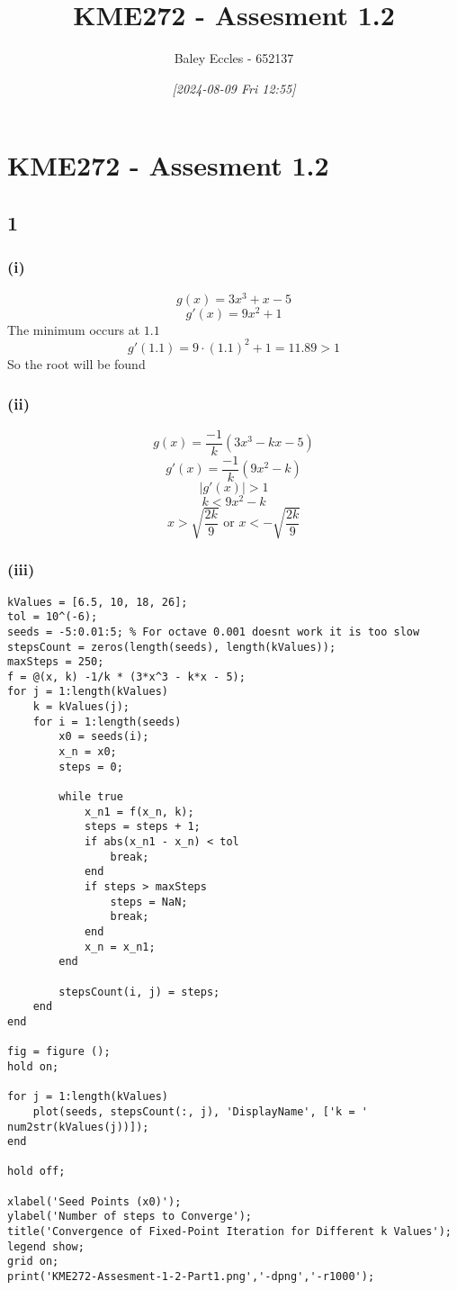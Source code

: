 \documentclass[11pt]{article}
\author{Baley Eccles - 652137}
\date{\textit{{[}2024-08-09 Fri 12:55]}}
\title{KME272 - Assesment 1.2}
\begin{document}
\maketitle
\tableofcontents

\section{KME272 - Assesment 1.2}
\label{sec:org8c7a200}
\subsection{1}
\label{sec:orgd059dc5}
\subsubsection{(i)}
\label{sec:orgf77a0f1}
\[g(x)=3x^3+x-5\]
\[g'(x)=9x^2+1\]
The minimum occurs at \(1.1\)
\[g'(1.1)=9\cdot(1.1)^2+1=11.89>1\]
So the root will be found
\subsubsection{(ii)}
\label{sec:org8fede7a}
\[g(x)=\frac{-1}{k}(3x^3-kx-5)\]
\[g'(x)=\frac{-1}{k}(9x^2-k)\]
\[\lvert g'(x)\rvert >1\]
\[k<9x^2-k\]
\[x>\sqrt{\frac{2k}{9}} \textrm{ or } x<-\sqrt{\frac{2k}{9}}\]
\subsubsection{(iii)}
\label{sec:orgee7665f}
\begin{verbatim}
kValues = [6.5, 10, 18, 26];
tol = 10^(-6);
seeds = -5:0.01:5; % For octave 0.001 doesnt work it is too slow
stepsCount = zeros(length(seeds), length(kValues));
maxSteps = 250;
f = @(x, k) -1/k * (3*x^3 - k*x - 5);
for j = 1:length(kValues)
    k = kValues(j);
    for i = 1:length(seeds)
        x0 = seeds(i);
        x_n = x0;
        steps = 0;

        while true
            x_n1 = f(x_n, k);
            steps = steps + 1;
            if abs(x_n1 - x_n) < tol
                break;
            end
            if steps > maxSteps
                steps = NaN;
                break;
            end
            x_n = x_n1;
        end

        stepsCount(i, j) = steps;
    end
end

fig = figure ();
hold on;

for j = 1:length(kValues)
    plot(seeds, stepsCount(:, j), 'DisplayName', ['k = '    num2str(kValues(j))]);
end

hold off;

xlabel('Seed Points (x0)');
ylabel('Number of steps to Converge');
title('Convergence of Fixed-Point Iteration for Different k Values');
legend show;
grid on;
print('KME272-Assesment-1-2-Part1.png','-dpng','-r1000');
\end{verbatim}
\end{document}
